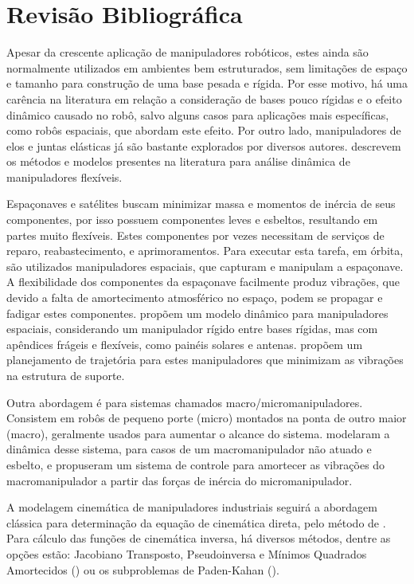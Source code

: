 \chapter{Revisão Bibliográfica}

Apesar da crescente aplicação de manipuladores robóticos, estes ainda são
normalmente utilizados em ambientes bem estruturados, sem limitações de espaço e
tamanho para construção de uma base pesada e rígida. Por esse motivo, há uma
carência na literatura em relação a consideração de bases pouco rígidas e o efeito
dinâmico causado no robô, salvo alguns casos para aplicações mais específicas,
como robôs espaciais, que abordam este efeito.
Por outro lado, manipuladores de elos e juntas elásticas já são bastante
explorados por diversos autores.
\citet{dwivedy2006dynamic} descrevem os métodos e modelos presentes na
literatura para análise dinâmica de manipuladores flexíveis.

Espaçonaves e satélites buscam minimizar massa e momentos de inércia de seus
componentes, por isso possuem componentes leves e
esbeltos, resultando em partes muito flexíveis. Estes componentes por vezes
necessitam de serviços de reparo, reabastecimento, e aprimoramentos. Para
executar esta tarefa, em órbita, são utilizados manipuladores espaciais, que
capturam e manipulam a espaçonave. A flexibilidade dos componentes
da espaçonave facilmente produz vibrações, que devido a falta de
amortecimento atmosférico no espaço, podem se propagar e fadigar estes
componentes.
\citet{xu2014dynamics} propõem um modelo dinâmico para manipuladores espaciais,
considerando um manipulador rígido entre bases rígidas, mas com apêndices
frágeis e flexíveis, como painéis solares e antenas.
\citet{torres1993path} propõem um planejamento de trajetória para estes
manipuladores que minimizam as vibrações na estrutura de suporte.

Outra abordagem é para sistemas chamados macro/micromanipuladores. Consistem
em robôs de pequeno porte (micro) montados na ponta de outro maior (macro),
geralmente usados para aumentar o alcance do sistema. \citet{book1999inverse}
modelaram a dinâmica desse sistema, para casos de um macromanipulador não
atuado e esbelto, e propuseram um sistema de controle para amortecer as
vibrações do macromanipulador a partir das forças de inércia do micromanipulador.

A modelagem cinemática de manipuladores industriais seguirá a abordagem clássica
para determinação da equação de cinemática direta, pelo método de
\citet{hartenberg1955kinematic}. Para cálculo das funções de cinemática inversa,
há diversos métodos, dentre as opções estão: Jacobiano Transposto,
Pseudoinversa e Mínimos Quadrados Amortecidos (\citet{buss2004introduction}) ou
os subproblemas de Paden-Kahan (\citet{murray1994mathematical}).

